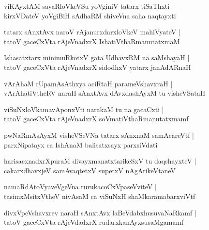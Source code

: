 \documentclass[twoside,12pt,openright]{book}
\newcounter{shloka}[chapter]
\begin{document}
\begin{shloka}
viKAyxtAM savaRloVkeVSu yoVginiV tatarx tiSaThxti \\
kirxVDateV yoVgiBiH sAdhaRM shiveVna saha naqtayxti 
\end{shloka}

\begin{shloka}
tatarx sAnxtAvx naroV rAjanurxdarxloVkeV mahiVyateV |\\
tatoV gaceCxVta rAjeVnadxrX IshatiVthaRmanutatxmaM
\end{shloka}

\begin{shloka}
Ishasatxtarx minimuRkotxV gata UdhavxRM na saMshayaH |\\
tatoV gaceCxVta rAjeVnadxrX sidodhxV yatarx janAdARnaH 
\end{shloka}

\begin{shloka}
vArAhaM rUpamAsAthxya aciRtaH parameVshavxraH |\\
vArAhatiVtheRV naraH sAnxtAvx dAvxdashAyxM tu visheVSataH 
\end{shloka}

\begin{shloka}
viSuNxloVkamavAponxVti narakaM tu na gacaCxti |\\
tatoV gaceCxVta rAjeVnadxrX soVmatiVthaRmanutatxmamf
\end{shloka}

\begin{shloka}
pwNaRmAsAyxM visheVSeVNa tatarx sAnxnaM samAcareVtf |\\
parxNipatayx ca IshAnaM balisatxsayx parxsiVdati
\end{shloka}

\begin{shloka}
harisacxnadxrXpuraM divayxmanatxtarikeSxV tu daqshayxteV |\\
cakarxdhavxjeV samAvaqtetxV supetxV nAgArikeVtaneV 
\end{shloka}

\begin{shloka}
namaRdAtoVyaveVgeVna rurukacoCxVpaseVviteV |\\
tasimxMsitxVtheV nivAsaM ca viSuNxH shaMkaramabarxviVtf 
\end{shloka}

\begin{shloka}
divxVpeVshavxrev naraH sAnxtAvx laBeVdabxhusuvaNaRkamf |\\
tatoV gaceCxVta rAjeVdadxrX rudarxkanAyxsusaMgamamf  
\end{shloka}
\end{document}
